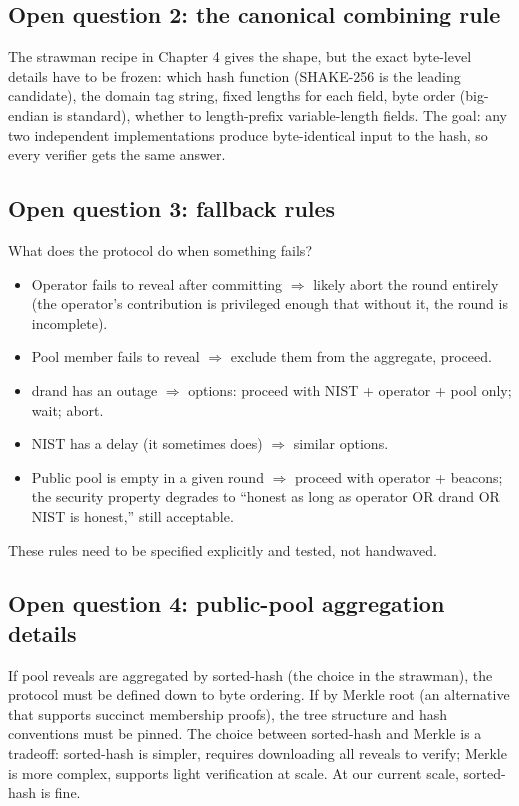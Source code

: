 \documentclass[11pt]{article}
\begin{document}
\subsection*{Open question 2: the canonical combining rule}

The strawman recipe in Chapter 4 gives the shape, but the exact byte-level details have to be frozen: which hash function (SHAKE-256 is the leading candidate), the domain tag string, fixed lengths for each field, byte order (big-endian is standard), whether to length-prefix variable-length fields. The goal: any two independent implementations produce byte-identical input to the hash, so every verifier gets the same answer.

\subsection*{Open question 3: fallback rules}

What does the protocol do when something fails?

\begin{itemize}[leftmargin=2em, itemsep=2pt]
\item Operator fails to reveal after committing $\Rightarrow$ likely abort the round entirely (the operator's contribution is privileged enough that without it, the round is incomplete).
\item Pool member fails to reveal $\Rightarrow$ exclude them from the aggregate, proceed.
\item drand has an outage $\Rightarrow$ options: proceed with NIST + operator + pool only; wait; abort.
\item NIST has a delay (it sometimes does) $\Rightarrow$ similar options.
\item Public pool is empty in a given round $\Rightarrow$ proceed with operator + beacons; the security property degrades to ``honest as long as operator OR drand OR NIST is honest,'' still acceptable.
\end{itemize}

These rules need to be specified explicitly and tested, not handwaved.

\subsection*{Open question 4: public-pool aggregation details}

If pool reveals are aggregated by sorted-hash (the choice in the strawman), the protocol must be defined down to byte ordering. If by Merkle root (an alternative that supports succinct membership proofs), the tree structure and hash conventions must be pinned. The choice between sorted-hash and Merkle is a tradeoff: sorted-hash is simpler, requires downloading all reveals to verify; Merkle is more complex, supports light verification at scale. At our current scale, sorted-hash is fine.
\end{document}
